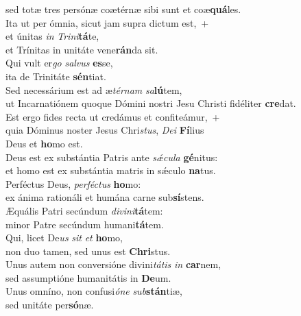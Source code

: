 \evenverse sed totæ tres persónæ coætérnæ sibi sunt et coæ\textbf{quá}les.\\
\oddverse Ita ut per ómnia, sicut jam supra dictum est,~+\\
\oddverse  et únitas \textit{in} \textit{Tri}\textit{ni}\textbf{tá}te,~\*\\
\oddverse et Trínitas in unitáte vene\textbf{rán}da sit.\\
\evenverse Qui vult er\textit{go} \textit{sal}\textit{vus} \textbf{es}se,~\*\\
\evenverse ita de Trinitáte \textbf{sén}tiat.\\
\oddverse Sed necessárium est ad æ\textit{tér}\textit{nam} \textit{sa}\textbf{lú}tem,~\*\\
\oddverse ut Incarnatiónem quoque Dómini nostri Jesu Christi fidéliter \textbf{cre}dat.\\
\evenverse Est ergo fides recta ut credámus et confiteámur,~+\\
\evenverse  quia Dóminus noster Jesus Chri\textit{stus}, \textit{De}\textit{i} \textbf{Fí}lius~\*\\
\evenverse Deus et \textbf{ho}mo est.\\
\oddverse Deus est ex substántia Patris ante \textit{sǽ}\textit{cu}\textit{la} \textbf{gé}nitus:~\*\\
\oddverse et homo est ex substántia matris in sǽculo \textbf{na}tus.\\
\evenverse Perféctus Deus, \textit{per}\textit{fé}\textit{ctus} \textbf{ho}mo:~\*\\
\evenverse ex ánima rationáli et humána carne sub\textbf{sí}stens.\\
\oddverse Æquális Patri secúndum \textit{di}\textit{vi}\textit{ni}\textbf{tá}tem:~\*\\
\oddverse minor Patre secúndum humani\textbf{tá}tem.\\
\evenverse Qui, licet De\textit{us} \textit{sit} \textit{et} \textbf{ho}mo,~\*\\
\evenverse non duo tamen, sed unus est \textbf{Chri}stus.\\
\oddverse Unus autem non conversióne divini\textit{tá}\textit{tis} \textit{in} \textbf{car}nem,~\*\\
\oddverse sed assumptióne humanitátis in \textbf{De}um.\\
\evenverse Unus omníno, non confusi\textit{ó}\textit{ne} \textit{sub}\textbf{stán}tiæ,~\*\\
\evenverse sed unitáte per\textbf{só}næ.\\
